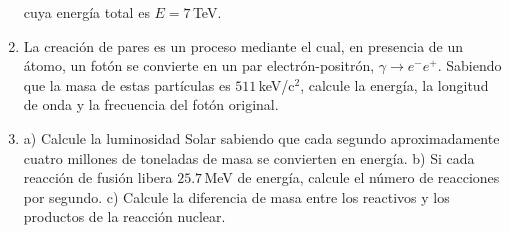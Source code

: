 \documentclass[a4paper,12pt]{article}
\begin{document}
\begin{enumerate}
		cuya energía total es $E=7$\,TeV.
	\item La creación de pares es un proceso mediante el cual, en presencia de
		un átomo, un fotón se convierte en un par electrón-positrón, $\gamma
		\to e^- e^+$. Sabiendo que la masa de estas partículas es
		$511$\,keV/c$^2$, calcule la energía, la longitud de onda y la
		frecuencia del fotón original.
	\item a) Calcule la luminosidad Solar sabiendo que cada segundo
		aproximadamente cuatro millones de toneladas de masa se convierten en
		energía. b) Si cada reacción de fusión libera $25.7$\,MeV de energía,
		calcule el número de reacciones por segundo. c) Calcule la diferencia
		de masa entre los reactivos y los productos de la reacción nuclear.  
\end{enumerate}
\end{document}
